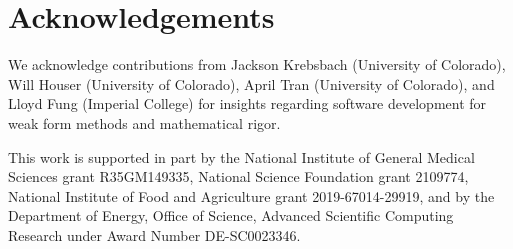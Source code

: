 \documentclass{juliacon}
\begin{document}
\section{Acknowledgements}

We acknowledge contributions from Jackson Krebsbach (University of Colorado), Will Houser (University of Colorado), April Tran (University of Colorado), and Lloyd Fung
(Imperial College) for insights regarding software development for weak form methods and mathematical rigor.

This work is supported in part by the National Institute of General Medical Sciences grant R35GM149335, National Science Foundation grant 
2109774, National Institute of Food and Agriculture grant 2019-67014-29919, and by the Department of Energy, Office of Science, Advanced Scientific Computing Research under Award Number DE-SC0023346.



\end{document}

